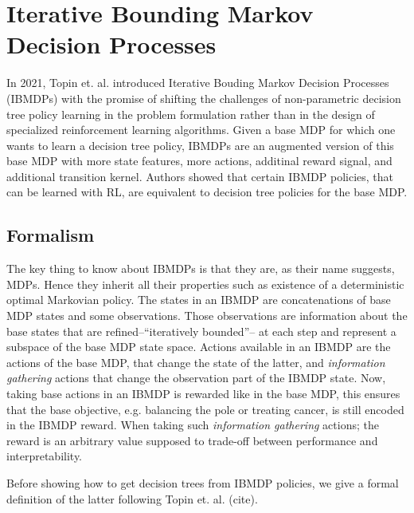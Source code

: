 \section{Iterative Bounding Markov Decision Processes}
In 2021, Topin et. al. introduced Iterative Bouding Markov Decision Processes (IBMDPs) with the promise of shifting the challenges of non-parametric decision tree policy learning in the problem formulation rather than in the design of specialized reinforcement learning algorithms.
Given a base MDP for which one wants to learn a decision tree policy, IBMDPs are an augmented version of this base MDP with more state features, more actions, additinal reward signal, and additional transition kernel.
Authors showed that certain IBMDP policies, that can be learned with RL, are equivalent to decision tree policies for the base MDP. 
\subsection{Formalism}
The key thing to know about IBMDPs is that they are, as their name suggests, MDPs. Hence they inherit all their properties such as existence of a deterministic optimal Markovian policy.
The states in an IBMDP are concatenations of base MDP states and some observations. Those observations are information about the base states that are refined--``iteratively bounded''-- at each step and represent a subspace of the base MDP state space.
Actions available in an IBMDP are the actions of the base MDP, that change the state of the latter, and \textit{information gathering} actions that change the observation part of the IBMDP state.
Now, taking base actions in an IBMDP is rewarded like in the base MDP, this ensures that the base objective, e.g. balancing the pole or treating cancer, is still encoded in the IBMDP reward. When taking such \textit{information gathering} actions; the reward is an arbitrary value supposed to trade-off between performance and interpretability.
 
Before showing how to get decision trees from IBMDP policies, we give a formal definition of the latter following Topin et. al. (cite).

